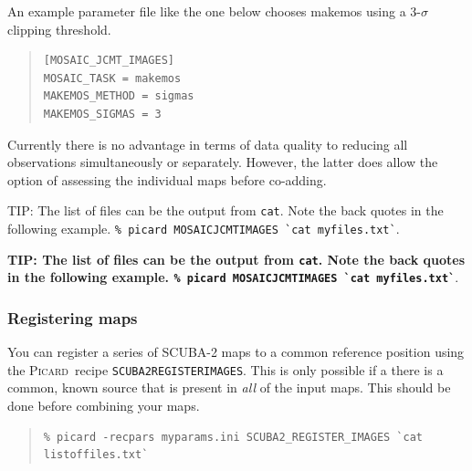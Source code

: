 \documentclass[twoside,11pt]{article}
\newenvironment{latexonly}{}{}
\newcommand{\xref}[3]{#1}
\renewcommand{\_}{\texttt{\symbol{95}}}
\newenvironment{fmpage}[1]{\begin{lrbox}{\fmbox}\begin{minipage}{#1}}{\end{minipage}\end{lrbox}\fbox{\usebox{\fmbox}}}
\newenvironment{myquote}{
   \color{MidnightBlue}\begin{quote}\begin{small}}{
   \end{small}\end{quote}
}
\newcommand{\picard}{\xref{\textsc{Picard}}{sun265}{}}
\newcommand{\drrecipe}[1]{\texttt{#1}}
\newcommand{\task}[1]{\textsf{#1}}
\newcommand{\file}[1]{\texttt{#1}}
\renewenvironment{myquote}{
      \begin{quote}\begin{small}}{
      \end{small}\end{quote}
   }
\begin{document}
An example parameter file like the one below chooses \task{makemos}
using a 3-$\sigma$ clipping threshold.

\begin{quote}
\begin{verbatim}
[MOSAIC_JCMT_IMAGES]
MOSAIC_TASK = makemos
MAKEMOS_METHOD = sigmas
MAKEMOS_SIGMAS = 3
\end{verbatim}
\end{quote}

Currently there is no advantage in terms of data quality to reducing
all observations simultaneously or separately. However, the latter
does allow the option of assessing the individual maps before co-adding.

\begin{latexonly}
\begin{center}
\begin{fmpage}{0.95\linewidth}
\vspace{0.1cm}

TIP: The list of files can be the output from \texttt{cat}. Note the back quotes in
the following example.
\newline\texttt{\% picard MOSAIC\_JCMT\_IMAGES \`{}cat myfiles.txt\`{}}.
\vspace{0.1cm}
\end{fmpage}
\end{center}
\end{latexonly}

\begin{htmlonly}
\textbf{TIP: The list of files can be the output from \file{cat}. Note the
back quotes in the following example.
\texttt{\% picard MOSAIC\_JCMT\_IMAGES \`{}cat myfiles.txt\`{}}}.
\end{htmlonly}

\subsubsection{Registering maps}

You can register a series of SCUBA-2 maps to a common reference
position using the \picard\ recipe
\xref{\drrecipe{SCUBA2\_REGISTER\_IMAGES}}{sun265}{SCUBA2\_REGISTER\_IMAGES}.
This is only possible if a there is a common, known source that is
present in \textit{all} of the input maps. This should be done before
combining your maps.
\begin{myquote}
\begin{verbatim}
% picard -recpars myparams.ini SCUBA2_REGISTER_IMAGES `cat listoffiles.txt`
\end{verbatim}
\end{myquote}
\end{document}
